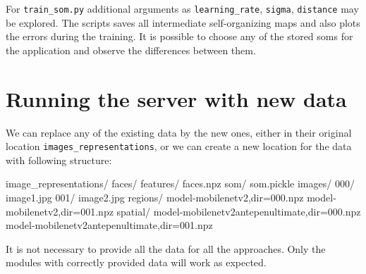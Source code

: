 For \verb+train_som.py+ additional arguments as \verb+learning_rate+, \verb+sigma+, \verb+distance+ may be explored. The scripts saves all intermediate self-organizing maps and also plots the errors during the training. It is possible to choose any of the stored \acrshort{som}s for the application and observe the differences between them.

\section{Running the server with new data}
\label{s:dir_structure}

We can replace any of the existing data by the new ones, either in their original location \verb+images_representations+, or we can create a new location for the data with following structure:


\vspace{0.5cm}
\begin{boxedverbatim}
image_representations/
    faces/
        features/
            faces.npz
        som/
            som.pickle
    images/
        000/
            image1.jpg
        001/
            image2.jpg
    regions/
        model-mobilenetv2,dir=000.npz
        model-mobilenetv2,dir=001.npz
    spatial/
        model-mobilenetv2antepenultimate,dir=000.npz
        model-mobilenetv2antepenultimate,dir=001.npz
\end{boxedverbatim}
\vspace{0.5cm}

It is not necessary to provide all the data for all the approaches. Only the modules with correctly provided data will work as expected.
































